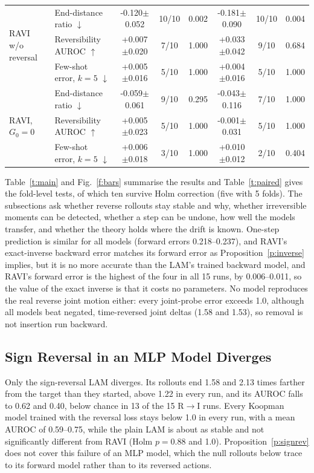 \documentclass{jcse}
\newcommand{\method}{RAVI}
\begin{document}
\begin{table}
\begin{tabular}{llcccccc}
		\midrule
		\multirow{3}{*}{{\method} w/o reversal} & End-distance ratio $\downarrow$ & -0.120$\pm$0.052 & 10/10 & 0.002 & -0.181$\pm$0.090 & 10/10 & 0.004 \\
		 & Reversibility AUROC $\uparrow$ & +0.007$\pm$0.020 & 7/10 & 1.000 & +0.033$\pm$0.042 & 9/10 & 0.684 \\
		 & Few-shot error, $k=5$ $\downarrow$ & +0.005$\pm$0.016 & 5/10 & 1.000 & +0.004$\pm$0.016 & 5/10 & 1.000 \\
		\midrule
		\multirow{3}{*}{{\method}, $G_0=0$} & End-distance ratio $\downarrow$ & -0.059$\pm$0.061 & 9/10 & 0.295 & -0.043$\pm$0.116 & 7/10 & 1.000 \\
		 & Reversibility AUROC $\uparrow$ & +0.005$\pm$0.023 & 5/10 & 1.000 & -0.001$\pm$0.031 & 5/10 & 1.000 \\
		 & Few-shot error, $k=5$ $\downarrow$ & +0.006$\pm$0.018 & 3/10 & 1.000 & +0.010$\pm$0.012 & 2/10 & 0.404 \\
		\bottomrule
	\end{tabular}
\end{table}

Table~\ref{t:main} and Fig.~\ref{f:bars} summarise the results and Table~\ref{t:paired} gives the fold-level tests, of which ten survive Holm correction (five with 5 folds).
The subsections ask whether reverse rollouts stay stable and why, whether irreversible moments can be detected, whether a step can be undone, how well the models transfer, and whether the theory holds where the drift is known.
One-step prediction is similar for all models (forward errors 0.218--0.237), and {\method}'s exact-inverse backward error matches its forward error as Proposition~\ref{p:inverse} implies, but it is no more accurate than the LAM's trained backward model, and {\method}'s forward error is the highest of the four in all 15 runs, by 0.006--0.011, so the value of the exact inverse is that it costs no parameters.
No model reproduces the real reverse joint motion either: every joint-probe error exceeds 1.0, although all models beat negated, time-reversed joint deltas (1.58 and 1.53), so removal is not insertion run backward.

\subsection{Sign Reversal in an MLP Model Diverges}
Only the sign-reversal LAM diverges. Its rollouts end 1.58 and 2.13 times farther from the target than they started, above 1.22 in every run, and its AUROC falls to 0.62 and 0.40, below chance in 13 of the 15 R$\to$I runs.
Every Koopman model trained with the reversal loss stays below 1.0 in every run, with a mean AUROC of 0.59--0.75, while the plain LAM is about as stable and not significantly different from {\method} (Holm $p=0.88$ and 1.0).
Proposition~\ref{p:signrev} does not cover this failure of an MLP model, which the null rollouts below trace to its forward model rather than to its reversed actions.
\end{document}
